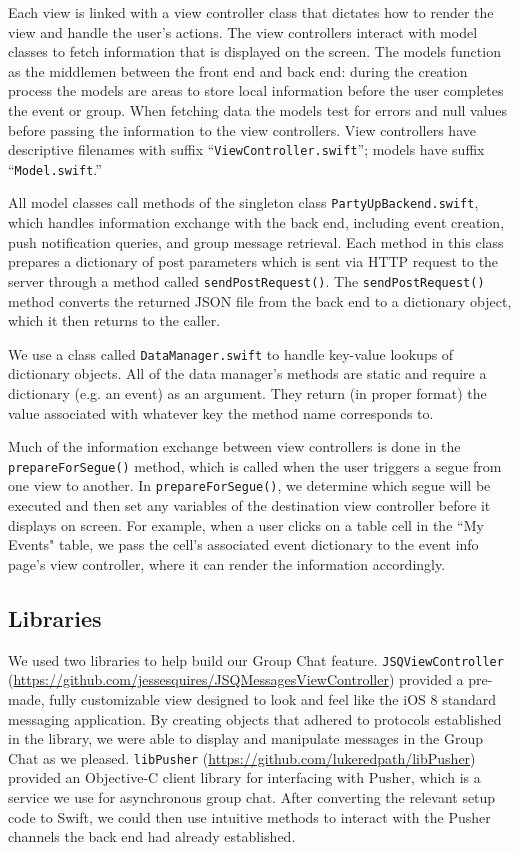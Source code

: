 \documentclass[12pt]{article}
\begin{document}
Each view is linked with a view controller class
that dictates how to render the view and handle the user's actions. 
The view controllers interact with model classes to fetch information 
that is displayed on the screen. 
The models function as the middlemen between the front end and back end: 
during the creation process the models are areas to store local information 
before the user completes the event or group. When fetching data the models 
test for errors and null values before passing the information to the view controllers.
View controllers have descriptive filenames with suffix ``\texttt{ViewController.swift}''; 
models have suffix ``\texttt{Model.swift}.''

All model classes call methods of the singleton class \texttt{PartyUpBackend.swift},
which handles information exchange with the back end, including event creation,
push notification queries, and group message retrieval.
Each method in this class prepares a dictionary of post parameters which is
sent via HTTP request to the server through a method called \texttt{sendPostRequest()}.
The \texttt{sendPostRequest()} method converts the returned JSON file from the back end to a dictionary object,
which it then returns to the caller.

We use a class called \texttt{DataManager.swift} to handle key-value lookups of dictionary objects.
All of the data manager's methods are static and require a dictionary (e.g. an event) as an argument.
They return (in proper format) the value associated with whatever key the method name corresponds to. 

Much of the information exchange between view controllers is done in the \texttt{prepareForSegue()} method,
which is called when the user triggers a segue from one view to another. In \texttt{prepareForSegue()},
we determine which segue will be executed and then set any variables of the destination view
controller before it displays on screen.
For example, when a user clicks on a table cell in the ``My Events" table,
we pass the cell's associated event dictionary to the event info page's view controller,
where it can render the information accordingly. 

\subsection{Libraries}

We used two libraries to help build our Group Chat feature.
\texttt{JSQViewController} (\url{https://github.com/jessesquires/JSQMessagesViewController})
provided a pre-made, fully customizable view designed to look and feel like the iOS 8 standard
messaging application.
By creating objects that adhered to protocols established in the library, we were able to display
and manipulate messages in the Group Chat as we pleased.
\texttt{libPusher} (\url{https://github.com/lukeredpath/libPusher}) provided an Objective-C
client library for interfacing with Pusher, which is a service we use for asynchronous group
chat.
After converting the relevant setup code to Swift, we could then use intuitive methods to
interact with the Pusher channels the back end had already established.
\end{document}
